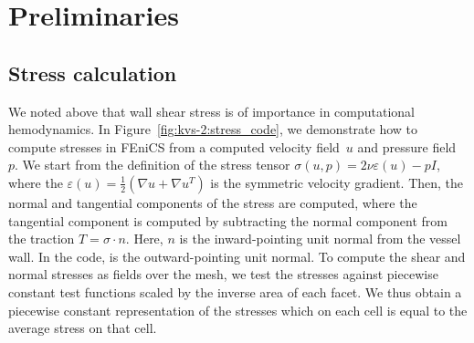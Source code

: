 \section{Preliminaries}

\subsection{Stress calculation}

We noted above that wall shear stress is of importance in
computational hemodynamics. In Figure~\ref{fig:kvs-2:stress_code}, we
demonstrate how to compute stresses in FEniCS from a computed velocity
field~$u$ and pressure field~$p$. We start from the definition of the
stress tensor $\sigma(u,p) = 2 \nu \varepsilon (u) - p I$, where the
$\varepsilon(u) = \frac{1}{2}(\nabla u + \nabla u^T)$ is the symmetric
velocity gradient. Then, the normal and tangential components of the
stress are computed, where the tangential component is computed by
subtracting the normal component from the traction $T = \sigma \cdot
n$. Here, $n$ is the inward-pointing unit normal from the vessel
wall. In the code,  is the outward-pointing unit normal. To
compute the shear and normal stresses as fields over the mesh, we test
the stresses against piecewise constant test functions scaled by the
inverse area of each facet. We thus obtain a piecewise constant
representation of the stresses which on each cell is equal to the
average stress on that cell.


